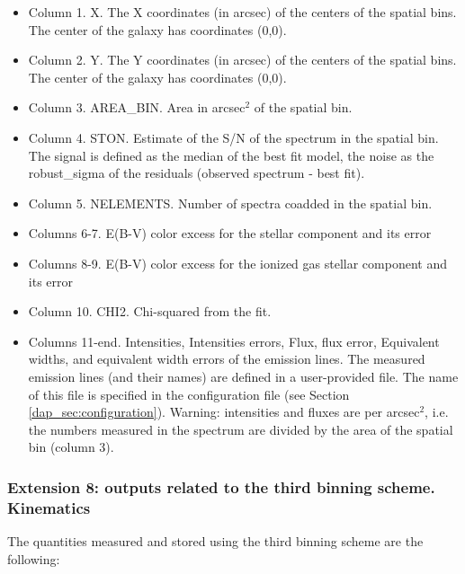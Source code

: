 \begin{itemize}

\item Column 1. X. The X coordinates (in arcsec) of the centers of the spatial bins. The center of the galaxy has coordinates (0,0).
\item Column 2. Y. The Y coordinates (in arcsec) of the centers of the spatial bins. The center of the galaxy has coordinates (0,0).
\item Column 3. AREA\_BIN. Area in arcsec$^2$ of the spatial bin.
\item Column 4. STON. Estimate of the S/N of the spectrum in the
  spatial bin. The signal is defined as the median of the best fit
  model, the noise as the robust\_sigma of the residuals (observed
  spectrum - best fit).
\item Column 5. NELEMENTS. Number of spectra coadded in the spatial bin.
\item Columns 6-7. E(B-V) color excess for the stellar component and its error
\item Columns 8-9. E(B-V) color excess for the ionized gas stellar component and its error
\item Column 10.  CHI2. Chi-squared from the fit.
\item Columns 11-end. Intensities, Intensities errors, Flux, flux error, Equivalent widths, and
  equivalent width errors of the emission lines.  The measured
  emission lines (and their names) are defined in a user-provided
  file. The name of this file is specified in the configuration file
  (see Section \ref{dap_sec:configuration}). Warning: intensities and fluxes are per arcsec$^2$, i.e. the numbers measured in the spectrum are divided by the area of the spatial bin (column 3).
\end{itemize}

\subsubsection{Extension 8: outputs related to the third binning
  scheme. Kinematics} 

The quantities measured and stored using the third binning scheme are
the following:

